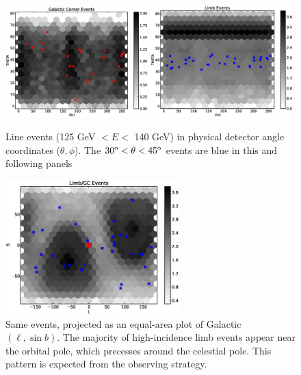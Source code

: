 \documentclass[aps,twocolumn,prd,superscriptaddress,showpacs,nofootinbib,fixfloat]{revtex4}
\newcommand{\degree}{^{\rm o}}
\begin{document}
\begin{figure}[p]
\centering
\includegraphics[width=0.49\textwidth]{plots/gc_theta_phi.eps}
\includegraphics[width=0.49\textwidth]{plots/limb_theta_phi.eps}
\caption{Line events (125 GeV $< E <$ 140 GeV) in physical detector angle
  coordinates ($\theta, \phi$).  The $30\degree < \theta < 45\degree$ events
  are blue in this and following panels}
\label{fig:theta-phi}
\end{figure}

% 
% 

\begin{figure}[p]
\centering
\includegraphics[width=0.6\textwidth]{plots/limb_l_b.eps}
\caption{Same events, projected as an equal-area plot of Galactic $(\ell, \sin
  b)$.  The majority of high-incidence limb events appear near the orbital
  pole, which precesses around the celestial pole.  This pattern is expected
  from the observing strategy.}
\label{fig:l-b}
\end{figure}
\end{document}
